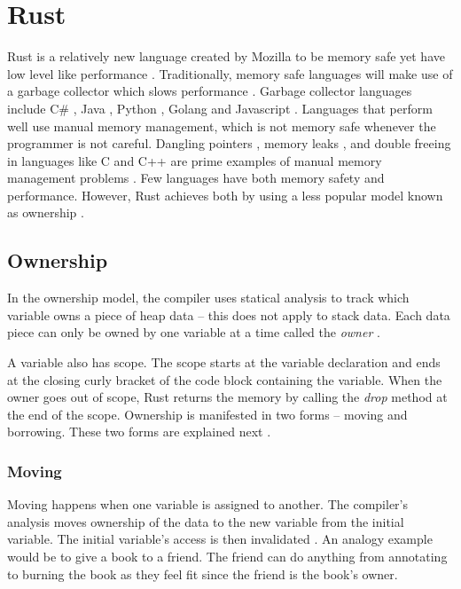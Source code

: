 \section{Rust}
\label{sec:Rust}
\newcommand{\errorh}[1]{\textcolor{Red!60!Maroon}{\footnotesize{- #1}}}

Rust is a relatively new language created by Mozilla to be memory safe yet have low level like performance \cite{klabnik_2019_01}.
Traditionally, memory safe languages will make use of a garbage collector which slows performance \cite{hertz_05_01}.
Garbage collector languages include C\# \cite{robinson_04_01}, Java \cite{gosling_96_01}, Python \cite{martelli_06_01}, Golang \cite{tsoukalos_18_01} and Javascript \cite{flanagan_06_01}.
Languages that perform well use manual memory management, which is not memory safe whenever the programmer is not careful.
Dangling pointers \cite{caballero_12_01}, memory leaks \cite{wilson_92_01}, and double freeing \cite{sharp_13_01} in languages like C and C++ are prime examples of manual memory management problems \cite{konrad_18_01}.
Few languages have both memory safety and performance.
However, Rust achieves both by using a less popular model known as ownership \cite{matsakis_14_01}.

\subsection{Ownership}
In the ownership model, the compiler uses statical analysis \cite{rasmussen_2019_01} to track which variable owns a piece of heap data -- this does not apply to stack data.
Each data piece can only be owned by one variable at a time called the \textit{owner} \cite{klabnik_2019_01}.

A variable also has scope.
The scope starts at the variable declaration and ends at the closing curly bracket of the code block containing the variable.
When the owner goes out of scope, Rust returns the memory by calling the \textit{drop} method at the end of the scope.
Ownership is manifested in two forms -- moving and borrowing.
These two forms are explained next \cite{klabnik_2019_01}.

\subsubsection{Moving}
Moving happens when one variable is assigned to another.
The compiler's analysis moves ownership of the data to the new variable from the initial variable.
The initial variable's access is then invalidated \cite{klabnik_2019_01}.
An analogy example would be to give a book to a friend.
The friend can do anything from annotating to burning the book as they feel fit since the friend is the book's owner.

